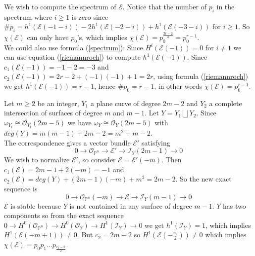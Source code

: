 \documentclass[
	oldfontcommands,
	sumario=abnt-6027-2012,
	12pt,			%
	openright,		%
	oneside,		%
	a4paper,		%
	english,		%
	brazil			%
	]{imecc-unicamp}
\begin{document}
\begin{example}[Disjoint union of conics]
\fi
We wish to compute the spectrum of $\mathcal{E}$. Notice that the number of $p_i$ in the spectrum where $i \geq 1$ is zero since $\# p_i=h^1(\mathcal{E}(-1-i))-2h^1(\mathcal{E}(-2-i))+h^1(\mathcal{E}(-3-i))$ for $i \geq 1$. So $\chi(\mathcal{E})$ can only have $p_0$'s, which implies $\chi(\mathcal{E})=p_0^{\frac{2r-2}{2}}=p_0^{r-1}$.\\
We could also use formula (\ref{spectrum}): Since
$H^i(\mathcal{E}(-1))=0$ for $i \not= 1$ we can use equation (\ref{riemannroch}) to compute $h^1(\mathcal{E}(-1))$. 
Since $c_1(\mathcal{E}(-1))=-1-2=-3$ and $c_2(\mathcal{E}(-1))=2r-2+(-1)(-1)+1=2r$, using formula (\ref{riemannroch}) we get $h^1(\mathcal{E}(-1))=r-1$, hence $\# p_0=r-1$, in other words $\chi(\mathcal{E})=p_0^{r-1}$.
\end{example}
\begin{example}\label{exemplobeilinson2}
Let $m \geq 2$ be an integer, $Y_1$ a plane curve of degree $2m-2$ and $Y_2$ a complete intersection of surfaces of degree $m$ and $m-1$. Let $Y=Y_1 \bigsqcup Y_2$. Since $\omega_{Y_i} \cong \mathcal{O}_{Y_i}(2m-5)$ we have $\omega_{Y} \cong \mathcal{O}_Y(2m-5)$ with $deg(Y)=m(m-1)+2m-2=m^2+m-2$.\\
The correspondence gives a vector bundle $\mathcal{E'}$ satisfying
\begin{equation}
0 \to \mathcal{O}_{\mathbb{P}^n} \to \mathcal{E'} \to \mathcal{I}_Y(2m-1) \to 0
\end{equation}
We wish to normalize $\mathcal{E}'$, so consider $\mathcal{E}=\mathcal{E}'(-m)$. Then $c_1(\mathcal{E})=2m-1+2(-m)=-1$ and $c_2(\mathcal{E})=deg(Y)+(2m-1)(-m)+m^2=2m-2$. So the new exact sequence is
\begin{equation}
0 \to \mathcal{O}_{\mathbb{P}^n}(-m) \to \mathcal{E} \to \mathcal{I}_Y(m-1) \to 0
\end{equation}
$\mathcal{E}$ is stable because $Y$ is not contained in any surface of degree $m-1$. $Y$ has two components so from the exact sequence $0 \to H^0(\mathcal{O}_{\mathbb{P}^n}) \to H^0(\mathcal{O}_Y) \to H^1(\mathcal{I}_Y) \to 0$ we get $h^1(\mathcal{I}_Y)=1$, which implies $H^1(\mathcal{E}(-m+1)) \not=0$. But $c_2=2m-2$ so $H^1(\mathcal{E}(-\frac{c_2}{2})) \not=0$ which implies $\chi(\mathcal{E})=p_0p_1...p_{\frac{c_2-2}{2}}$.
\end{example}
\end{document}
